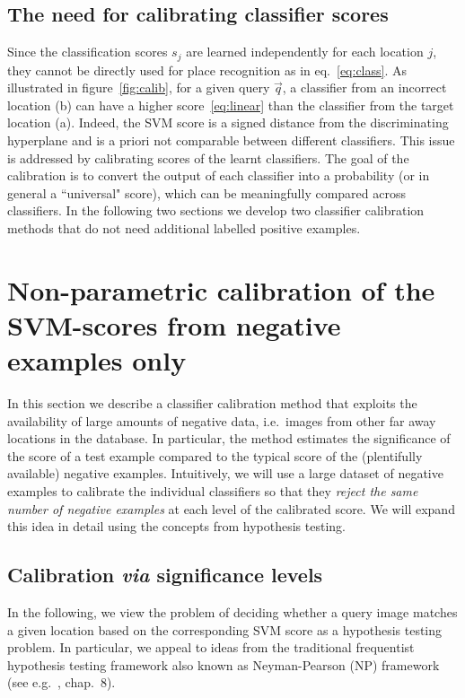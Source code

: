   \subsection{The need for calibrating classifier scores}
    Since the classification scores $s_j$ are learned independently for each location $j$, they cannot be directly used for place recognition as in eq.~\eqref{eq:class}. As illustrated in figure~\ref{fig:calib}, for a given query $\vec{q}$, a classifier from an incorrect location (b) can have a higher score~\eqref{eq:linear} than the classifier from the target location (a). Indeed, the SVM score is a signed distance from the discriminating hyperplane and is a priori not comparable between different classifiers. This issue is addressed by calibrating scores of the learnt classifiers. The goal of the calibration is to convert the output of each classifier into a probability (or in general a ``universal" score), which can be meaningfully compared across classifiers. In the following two sections we develop two classifier calibration methods that do not need additional labelled positive examples.
 
\section{Non-parametric calibration of the  SVM-scores from negative examples only}
\label{sec:calibration}

In this section we describe a classifier calibration method that exploits the availability of large amounts of negative data, i.e.\ images from other far away locations in the database.
In particular, the method estimates the significance of the score of a test example compared to the typical score of  the (plentifully available) negative examples. Intuitively, we will use a large dataset of negative examples to calibrate the individual classifiers so that they {\em reject the same number of negative examples} at each level of the calibrated score.   We will expand this idea in detail using the concepts from hypothesis testing. %


   \subsection{Calibration \emph{via} significance levels}
      In the following, we view  the problem of deciding whether a query image matches a given location based on the corresponding SVM score as a hypothesis testing problem. In particular, we appeal to ideas from the traditional frequentist hypothesis testing framework also known as Neyman-Pearson (NP) framework (see e.g.~\cite{casella2001statistical}, chap.~8).

